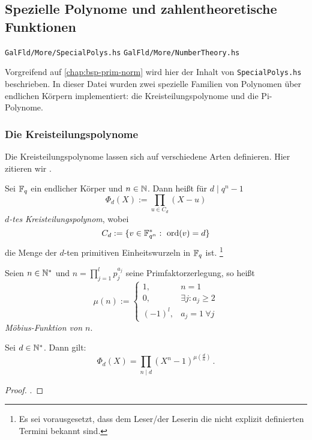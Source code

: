 \subsection{Spezielle Polynome und zahlentheoretische Funktionen}

\texttt{GalFld/More/SpecialPolys.hs}
\texttt{GalFld/More/NumberTheory.hs}

Vorgreifend auf \autoref{chap:bsp-prim-norm} wird hier der Inhalt von 
\texttt{SpecialPolys.hs} beschrieben. In dieser Datei wurden zwei spezielle
Familien von Polynomen über endlichen Körpern implementiert: die
Kreisteilungspolynome und die Pi-Polynome.

\subsubsection{Die Kreisteilungspolynome}

Die Kreisteilungspolynome lassen sich auf verschiedene Arten definieren. Hier
zitieren wir \cite[Abschnitt 4]{hach2013eki}.

\begin{definition}[Kreisteilungspolynom]
  Sei $\mathbb{F}_q$ ein endlicher Körper und $n\in \mathbb{N}$. Dann heißt für 
  $d\mid q^n-1$
  \[ \Phi_d(X) := \prod_{u \in C_d} (X-u)\]
  \emph{$d$-tes Kreisteilungspolynom}, wobei
  \[ C_d := \{ v\in \mathbb{F}_{q^n}^\ast:\ \operatorname{ord}(v) = d\}\]
  die Menge der $d$-ten primitiven Einheitswurzeln in $\mathbb{F}_q$ ist.%
  \footnote{Es sei vorausgesetzt, dass dem Leser/der Leserin 
  die nicht explizit definierten Termini bekannt sind.}
\end{definition}

\begin{definition}
  Seien $n \in \mathbb{N}^\ast$ und $n = \prod_{j=1}^l p_j^{a_j}$ seine
  Primfaktorzerlegung, so heißt
  \[ \mu(n) := \begin{cases} 1, &n=1\\ 0,& \exists j: a_j \geq 2\\
    (-1)^l, & a_j=1 \ \forall j \end{cases}\]
  \emph{Möbius-Funktion von $n$}.
\end{definition}

\begin{prop}
  Sei $d\in \mathbb{N}^\ast$. Dann gilt: 
  \[ \Phi_d(X) = \prod_{n\mid d} (X^n-1)^{\mu(\frac{d}{n})} \,.\]
\end{prop}
\begin{proof}
  \autocite[Abschnitt 4]{hach2013eki}.
\end{proof}

